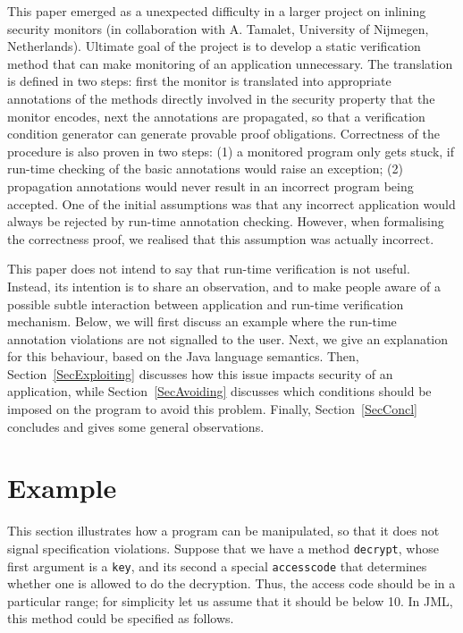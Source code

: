 \documentclass[]{llncs}
\def \unsc      {\symbol{95}}
\begin{document}
This paper emerged as a unexpected difficulty in a larger project on
inlining security monitors (in collaboration with A. Tamalet,
University of Nijmegen, Netherlands). Ultimate goal of the project is
to develop a static verification method that can make monitoring of an
application unnecessary. The translation is defined in two steps:
first the monitor is translated into appropriate annotations of the
methods directly involved in the security property that the monitor
encodes, next the annotations are propagated, so that a verification
condition generator can generate provable proof
obligations. Correctness of the procedure is also proven in two steps:
(1) a monitored program only gets stuck, if run-time checking of the
basic annotations would raise an exception; (2) propagation
annotations would never result in an incorrect program being
accepted. One of the initial assumptions was that any incorrect
application would always be rejected by run-time annotation
checking. However, when formalising the correctness proof, we realised
that this assumption was actually incorrect.

This paper does not intend to say that run-time verification is not
useful. Instead, its intention is to share an observation, and to make
people aware of a possible subtle interaction between application and
run-time verification mechanism. Below, we will first discuss an
example where the run-time annotation violations are not signalled to
the user. Next, we give an explanation for this behaviour, based on
the Java language semantics. Then, Section~\ref{SecExploiting}
discusses how this issue impacts security of an application, 
while Section~\ref{SecAvoiding} discusses which conditions
should be imposed on the program to avoid this problem. Finally,
Section~\ref{SecConcl} concludes and gives some general observations.

\section{Example}\label{SecExample}

This section illustrates how a program can be manipulated, so that it
does not signal specification violations. Suppose that we have a
method \texttt{decrypt}, whose first argument is a \texttt{key}, and
its second a special \texttt{access\unsc code} that determines
whether one is allowed to do the decryption. Thus, the access code
should be in a particular range; for simplicity let us assume that it
should be below 10. In JML, this method could be specified as follows.
\end{document}
